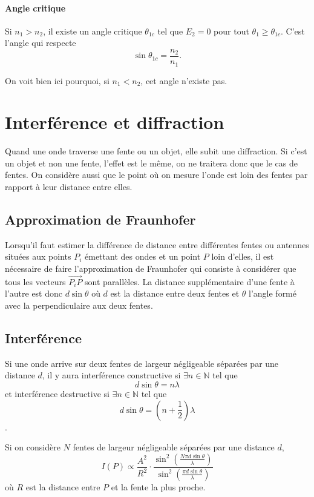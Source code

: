\paragraph{Angle critique}
Si $n_1 > n_2$, il existe un angle critique $\theta_{1c}$ tel que
$E_{2} = 0$ pour tout $\theta_1 \geq \theta_{1c}$.
C'est l'angle qui respecte
\[ \sin\theta_{1c} = \frac{n_2}{n_1}. \]

On voit bien ici pourquoi, si $n_1 < n_2$, cet angle n'existe pas.

\section{Interférence et diffraction}
Quand une onde traverse une fente ou un objet, elle subit une diffraction.
Si c'est un objet et non une fente, l'effet est le même,
on ne traitera donc que le cas de fentes.
On considère aussi que le point où on mesure l'onde est loin des fentes
par rapport à leur distance entre elles.

\subsection{Approximation de Fraunhofer}
\label{sec:fraunhofer}
Lorsqu'il faut estimer la différence de distance entre différentes
fentes ou antennes situées aux points $P_i$ émettant des ondes
et un point $P$ loin d'elles,
il est nécessaire de faire l'approximation de Fraunhofer qui
consiste à considérer que tous les vecteurs $\vec{P_iP}$
sont parallèles.
La distance supplémentaire d'une fente à l'autre est donc $d\sin\theta$
où $d$ est la distance entre deux fentes et $\theta$ l'angle
formé avec la perpendiculaire aux deux fentes.

\subsection{Interférence}
Si une onde arrive sur deux fentes de largeur négligeable séparées par
une distance $d$,
il y aura interférence constructive si $\exists n \in \mathbb{N}$ tel que
\[ d\sin\theta = n \lambda \]
et interférence destructive si $\exists n \in \mathbb{N}$ tel que
\[ d\sin\theta = \left(n+\frac{1}{2}\right) \lambda \].

Si on considère $N$ fentes de largeur négligeable séparées par une
distance $d$,
\[ I(P) \propto \frac{A^2}{R^2} \cdot
  \frac{\sin^2\left(\frac{N \pi d \sin\theta}{\lambda}\right)}
{\sin^2\left(\frac{\pi d \sin\theta}{\lambda}\right)} \]
où $R$ est la distance entre $P$ et la fente la plus proche.


